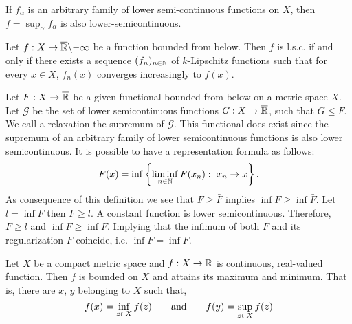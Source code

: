 \begin{theorem} If $ f_\alpha $ is an arbitrary family of lower semi-continuous functions on $X$, then $f=\sup_\alpha f_\alpha$ is also lower-semicontinuous.
\end{theorem}


\begin{definition}

\end{definition}

\begin{theorem}
	Let $f:X\rightarrow \overline{\mathbb{R}}\backslash{-\infty}$ be a function bounded from below. Then $f$ is l.s.c. if and only if there exists a sequence $(f_n)_{n\in \mathbb{N}}$ of $k$-Lipschitz functions such that for every $x\in X$, $f_n(x)$ converges increasingly to $f(x)$.
\end{theorem}

\begin{definition}
	Let $F:X\rightarrow \overline{\mathbb{R}}$ be a given functional bounded from below on a metric space $X$.  Let $\mathcal G$ be the set of lower semicontinuous functions $G: X\rightarrow \overline{\mathbb{R}}$, such that $G\leq F$. We call a relaxation the supremum of $\mathcal G$.  This functional does exist since the supremum of an arbitrary family of lower semicontinuous functions is also lower semicontinuous. It is possible to have a representation formula as follows:
	\begin{equation}
	\bar F(x) = \inf \left\lbrace \liminf_{n\in \mathbb{N}} F(x_n):\ x_n\rightarrow x \right\rbrace.
	\end{equation}
	As consequence of this definition we see that $F \geq \bar F$ implies $\inf F \geq \inf \bar F$. Let $l=\inf F$ then $F\geq l$. A constant function is lower semicontinuous. Therefore, $\bar F \geq l$ and $\inf \bar F \geq \inf F$. Implying that the infimum of both $F$ and its regularization $\bar F$ coincide, i.e. $\inf \bar F = \inf F$. 
\end{definition}


\begin{theorem}
	Let $X$ be a compact metric space and $f: X\rightarrow \mathbb{R}$ is continuous, real-valued function. Then $f$ is bounded on $X$ and attains its maximum and minimum. That is, there are $x$, $y$ belonging to $X$ such that,
	\begin{equation*}
	f(x)=\inf_{z\in X}f(z) \qquad \mathrm{and} \qquad f(y)=\sup_{z \in X} f(z)
	\end{equation*}
\end{theorem}

